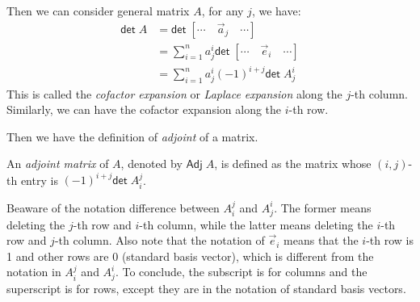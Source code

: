 \documentclass[
	11pt, %
	fleqn, %
	a4paper, %
]{LegrandOrangeBook}
\renewcommand{\det}{\mathsf{det\;}} %
\newcommand{\adj}{\mathsf{Adj\;}} %
\begin{document}
Then we can consider general matrix $A$, for any $j$, we have:
\[
    \begin{split}
        \det A & = \det [\cdots \quad \vec{a}_j \quad \cdots] \\
        & = \sum_{i = 1}^n a_j^i \det [\cdots \quad \vec{e}_i \quad \cdots] \\
        & = \sum_{i = 1}^n a_j^i (-1)^{i + j} \det A^i_j
    \end{split}
\]
This is called the \emph{cofactor expansion} or \emph{Laplace expansion} along the $j$-th column. Similarly, we can have the cofactor expansion along the $i$-th row.

Then we have the definition of \emph{adjoint} of a matrix.
\begin{definition}
    An \emph{adjoint matrix} of $A$, denoted by $\adj A$, is defined as the matrix whose $(i,j)$-th entry is $(-1)^{i + j} \det A_i^j$.
\end{definition}
\begin{remark}
    Beaware of the notation difference between $A_i^j$ and $A^i_j$. The former means deleting the $j$-th row and $i$-th column, while the latter means deleting the $i$-th row and $j$-th column. Also note that the notation of $\vec{e}_i$ means that the $i$-th row is 1 and other rows are 0 (standard basis vector), which is different from the notation in $A_i^j$ and $A^i_j$. To conclude, the subscript is for columns and the superscript is for rows, except they are in the notation of standard basis vectors.
\end{remark}
\end{document}
